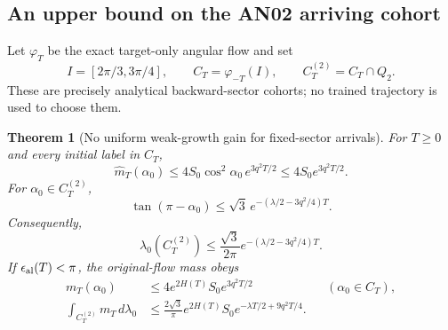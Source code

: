 \documentclass[11pt]{article}
\numberwithin{equation}{section}
\newtheorem{theorem}{Theorem}[section]
\theoremstyle{remark}\newtheorem{remark}[theorem]{Remark}
\newcommand{\dd}{\,d}
\newcommand{\1}{\mathbf 1}
\begin{document}
\subsection{An upper bound on the AN02 arriving cohort}
Let $\varphi_T$ be the exact target-only angular flow and set
\[
 I=[2\pi/3,3\pi/4],\qquad C_T=\varphi_{-T}(I),\qquad
 C_T^{(2)}=C_T\cap Q_2.
\]
These are precisely analytical backward-sector cohorts; no trained
trajectory is used to choose them.

\begin{theorem}[No uniform weak-growth gain for fixed-sector arrivals]
\label{inc:AN03:ret:v1:arrivalupper}
For $T\ge0$ and every initial label in $C_T$,
\begin{equation}\label{inc:AN03:ret:v1:arrivalmasshat}
 \widehat m_T(\alpha_0)
 \le4S_0\cos^2\alpha_0\,e^{3q^2T/2}
 \le4S_0e^{3q^2T/2}.
\end{equation}
For $\alpha_0\in C_T^{(2)}$,
\begin{equation}\label{inc:AN03:ret:v1:arrivalangle}
 \tan(\pi-\alpha_0)
 \le\sqrt3\,e^{-(\lambda/2-3q^2/4)T}.
\end{equation}
Consequently,
\begin{equation}\label{inc:AN03:ret:v1:arrivalmeasure}
 \lambda_0(C_T^{(2)})
 \le\frac{\sqrt3}{2\pi}e^{-(\lambda/2-3q^2/4)T}.
\end{equation}
If $\epsilon_{\rm al}(T)<\pi$, the original-flow mass obeys
\begin{align}
 m_T(\alpha_0)&\le4e^{2H(T)}S_0e^{3q^2T/2}
 &&(\alpha_0\in C_T),\label{inc:AN03:ret:v1:arrivalmass}\\
 \int_{C_T^{(2)}}m_T\dd\lambda_0
 &\le\frac{2\sqrt3}{\pi}e^{2H(T)}S_0
 e^{-\lambda T/2+9q^2T/4}.\label{inc:AN03:ret:v1:arrivalQ2mass}
\end{align}
\end{theorem}
\end{document}
